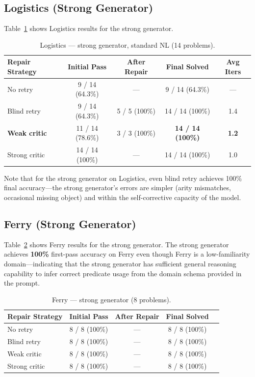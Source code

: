 \documentclass{article}
\begin{document}
\subsection{Logistics (Strong Generator)}
\label{sec:log_strong}

Table~\ref{tab:log_strong} shows Logistics results for the strong generator.

\begin{table}[h]
\centering
\caption{Logistics --- strong generator, standard NL (14 problems).}
\label{tab:log_strong}
\begin{tabular}{lcccc}
\toprule
\textbf{Repair Strategy} & \textbf{Initial Pass} & \textbf{After Repair} & \textbf{Final Solved} & \textbf{Avg Iters} \\
\midrule
No retry      & 9 / 14 (64.3\%)  & ---             & 9 / 14 (64.3\%)   & ---  \\
Blind retry   & 9 / 14 (64.3\%)  & 5 / 5 (100\%)   & 14 / 14 (100\%)  & 1.4  \\
\textbf{Weak critic} & 11 / 14 (78.6\%) & 3 / 3 (100\%)  & \textbf{14 / 14 (100\%)} & \textbf{1.2} \\
Strong critic & 14 / 14 (100\%)  & ---             & 14 / 14 (100\%)  & 1.0  \\
\bottomrule
\end{tabular}
\end{table}

Note that for the strong generator on Logistics, even blind retry achieves 100\%
final accuracy---the strong generator's errors are simpler (arity mismatches,
occasional missing object) and within the self-corrective capacity of the model.

\subsection{Ferry (Strong Generator)}
\label{sec:ferry_strong}

Table~\ref{tab:ferry_strong} shows Ferry results for the strong generator.  The
strong generator achieves \textbf{100\%} first-pass accuracy on Ferry even though
Ferry is a low-familiarity domain---indicating that the strong generator has
sufficient general reasoning capability to infer correct predicate usage from the
domain schema provided in the prompt.

\begin{table}[h]
\centering
\caption{Ferry --- strong generator (8 problems).}
\label{tab:ferry_strong}
\begin{tabular}{lcccc}
\toprule
\textbf{Repair Strategy} & \textbf{Initial Pass} & \textbf{After Repair} & \textbf{Final Solved} \\
\midrule
No retry      & 8 / 8 (100\%) & ---  & 8 / 8 (100\%) \\
Blind retry   & 8 / 8 (100\%) & ---  & 8 / 8 (100\%) \\
Weak critic   & 8 / 8 (100\%) & ---  & 8 / 8 (100\%) \\
Strong critic & 8 / 8 (100\%) & ---  & 8 / 8 (100\%) \\
\bottomrule
\end{tabular}
\end{table}
\end{document}
